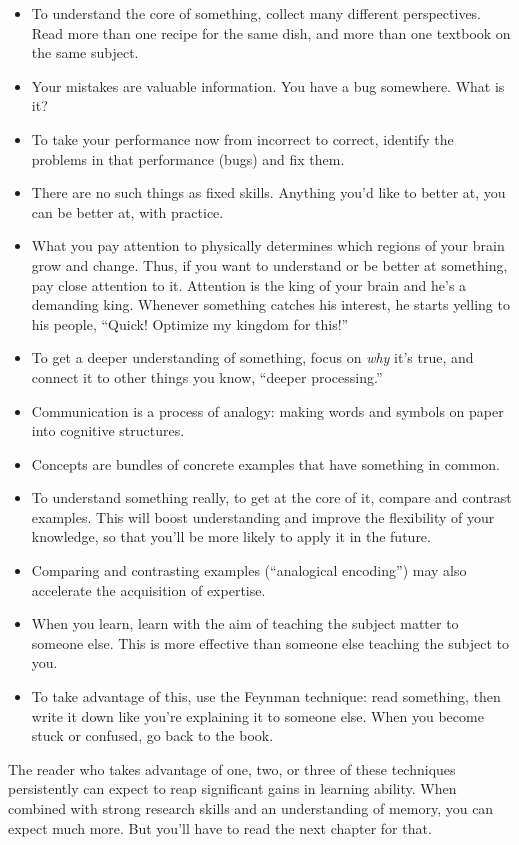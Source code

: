 \begin{itemize}
\itemsep1pt\parskip0pt
\item
  To understand the core of something, collect many different
  perspectives. Read more than one recipe for the same dish, and more
  than one textbook on the same subject.
\item
  Your mistakes are valuable information. You have a bug somewhere. What
  is it?
\item
  To take your performance now from incorrect to correct, identify the
  problems in that performance (bugs) and fix them.
\item
  There are no such things as fixed skills. Anything you'd like to
  better at, you can be better at, with practice.
\item
  What you pay attention to physically determines which regions of your
  brain grow and change. Thus, if you want to understand or be better at
  something, pay close attention to it. Attention is the king of your
  brain and he's a demanding king. Whenever something catches his
  interest, he starts yelling to his people, ``Quick! Optimize my
  kingdom for this!''
\item
  To get a deeper understanding of something, focus on \emph{why} it's true, and
  connect it to other things you know, ``deeper processing.''
\item
  Communication is a process of analogy: making words and
  symbols on paper into cognitive structures.
\item
  Concepts are bundles of concrete examples that have something in
  common.
\item
  To understand something really, to get at the core of it, compare and
  contrast examples. This will boost understanding and improve the
  flexibility of your knowledge, so that you'll be more likely to apply
  it in the future.
\item
  Comparing and contrasting examples (``analogical encoding'') may also
  accelerate the acquisition of expertise.
\item
  When you learn, learn with the aim of teaching the subject matter to
  someone else. This is more effective than someone else teaching the
  subject to you.
\item
  To take advantage of this, use the Feynman technique: read something,
  then write it down like you're explaining it to someone else. When you
  become stuck or confused, go back to the book.
\end{itemize}

The reader who takes advantage of one, two, or three of these techniques
persistently can expect to reap significant gains in learning ability.
When combined with strong research skills and an understanding of
memory, you can expect much more. But you'll have to read the next
chapter for that.
